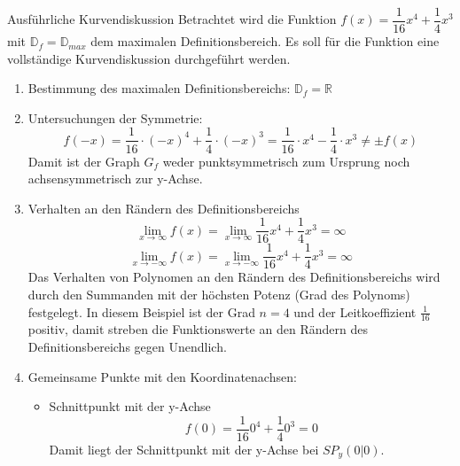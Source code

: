
\begin{bsp}{Ausführliche Kurvendiskussion}{}
Betrachtet wird die Funktion $f(x)= \dfrac{1}{16} x^4 +\dfrac{1}{4} x^3$ mit $\mathds{D}_f =\mathds{D}_{max}$ dem maximalen Definitionsbereich. Es soll für die Funktion eine vollständige Kurvendiskussion durchgeführt werden.
\begin{enumerate}
    \item Bestimmung des maximalen Definitionsbereichs: $\mathds{D}_f = \mathds{R}$
    \item Untersuchungen der Symmetrie:
    $$f(-x) = \frac{1}{16} \cdot (-x)^4 + \frac{1}{4} \cdot (-x)^3 = \frac{1}{16} \cdot x^4 - \frac{1}{4} \cdot x^3 \neq \pm f(x)$$ Damit ist der Graph $G_f$ weder punktsymmetrisch zum Ursprung noch achsensymmetrisch zur y-Achse.
    \item Verhalten an den Rändern des Definitionsbereichs
    $$\lim_{x\rightarrow \infty} f(x) = \lim_{x\rightarrow \infty} \dfrac{1}{16}x^4 +\dfrac{1}{4}x^3 = \infty$$
        $$\lim_{x\rightarrow -\infty} f(x) = \lim_{x\rightarrow -\infty} \dfrac{1}{16}x^4 +\dfrac{1}{4}x^3 = \infty$$
        Das Verhalten von Polynomen an den Rändern des Definitionsbereichs wird durch den Summanden mit der höchsten Potenz (Grad des Polynoms) festgelegt. In diesem Beispiel ist der Grad $n=4$ und der Leitkoeffizient $\frac{1}{16}$ positiv, damit streben die Funktionswerte an den Rändern des Definitionsbereichs gegen Unendlich.
    \item Gemeinsame Punkte mit den Koordinatenachsen:
    \begin{itemize}
        \item Schnittpunkt mit der y-Achse
    \begin{equation*}
        f(0) = \dfrac{1}{16}0^4 +\dfrac{1}{4}0^3 = 0
    \end{equation*}
    Damit liegt der Schnittpunkt mit der y-Achse bei $SP_y(0|0)$.

\end{itemize}
\end{enumerate}
\end{bsp}
